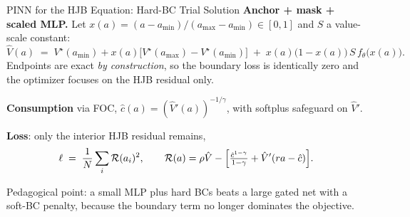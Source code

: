 \documentclass[aspectratio=169,11pt]{beamer}
\newcommand{\emphc}[1]{\textcolor{harvardcrimson}{#1}}
\begin{document}
\begin{frame}{PINN for the HJB Equation: Hard-BC Trial Solution}
\textbf{Anchor + mask + scaled MLP.}  Let $x(a) = (a-a_{\min})/(a_{\max}-a_{\min}) \in [0,1]$ and $S$ a value-scale constant:
\[
\hat V(a) \;=\; V^\star(a_{\min}) + x(a)\bigl[V^\star(a_{\max}) - V^\star(a_{\min})\bigr] \;+\; x(a)\bigl(1-x(a)\bigr)\,S\,f_\theta\bigl(x(a)\bigr).
\]
Endpoints are exact \emph{by construction}, so the boundary loss is identically zero and the optimizer focuses on the HJB residual only.

\vspace{0.3em}
\textbf{Consumption} via FOC, $\hat c(a) = (\hat V'(a))^{-1/\gamma}$, with softplus safeguard on $\hat V'$.

\vspace{0.3em}
\textbf{Loss}: only the interior HJB residual remains,
\[
\ell \;=\; \frac{1}{N}\sum_{i}\mathcal{R}(a_i)^2,
\qquad
\mathcal{R}(a) = \rho\hat V - \Bigl[\tfrac{\hat c^{1-\gamma}}{1-\gamma} + \hat V'(ra - \hat c)\Bigr].
\]

\vspace{0.2em}
{\small \emphc{Pedagogical point:} a small MLP plus hard BCs beats a large gated net with a soft-BC penalty, because the boundary term no longer dominates the objective.}
\end{frame}
\end{document}
